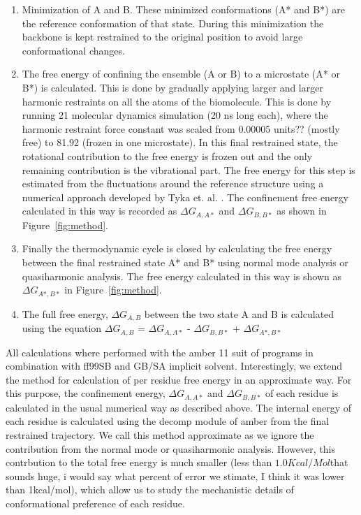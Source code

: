 \documentclass[12pt]{article}
\newcommand{\Alberto}[1]{\color{ForestGreen}#1\normalcolor }
\begin{document}
\begin{enumerate}

\item  Minimization of A and B. These minimized conformations (A* and B*) 
       are the reference conformation of that state. During this minimization the backbone is kept
       restrained to the original position to avoid large conformational changes.

   \item  The free energy of confining the ensemble (A or B) to a microstate (A* or B*) is
       calculated. This is done by gradually applying larger and larger
       harmonic restraints on all the atoms of the biomolecule. This is done by running 21 molecular dynamics simulation 
       (20 ns long each), where the harmonic restraint force constant was scaled from 0.00005
       \Alberto{units??}
       (mostly free) to 81.92 (frozen in one microstate). In this final restrained state, the
       rotational contribution to the free energy is frozen out
       and the only remaining contribution is the vibrational part. The free energy for this step is
       estimated from the fluctuations around
       the reference structure using a numerical
       approach developed by Tyka et. al. \cite{Tyka2006}. The confinement free energy calculated in
       this way is recorded as 
       $\Delta G_{A,A*}$ and $\Delta G_{B,B*}$ as shown in Figure~\ref{fig:method}.     

\item  Finally the thermodynamic cycle is closed by calculating the free energy between the final
       restrained state A* and B* using normal mode analysis or quasiharmonic analysis. The free energy calculated in 
       this way is shown as $\Delta G_{A*,B*}$ in Figure~\ref{fig:method}.

\item  The full free energy, $\Delta G_{A,B}$ between the two state A and B is calculated using the equation 
       $\Delta G_{A,B}$ = $\Delta G_{A,A*}$ - $\Delta G_{B,B*}$ + $\Delta G_{A*,B*}$  

\end{enumerate}

 All calculations where performed with the amber 11 suit of programs in combination with ff99SB and GB/SA implicit solvent. Interestingly, we extend the
method for calculation of per residue free energy in an approximate way. For this purpose, the confinement energy, 
$\Delta G_{A,A*}$ and $\Delta G_{B,B*}$ of each residue is calculated in the usual numerical way as described above. The
internal energy of each residue is calculated using the decomp module of amber from the final restrained trajectory. We 
call this method approximate as we ignore the contribution from the normal mode or quasiharmonic analysis. 
However, this contrbution to the total free energy is much smaller (less than $1.0
Kcal/Mol$\Alberto{that sounds huge, i would say what percent of error we stimate, I think it was
lower than 1kcal/mol}), which allow us to 
study the mechanistic details of conformational preference of each residue.      
\end{document}
